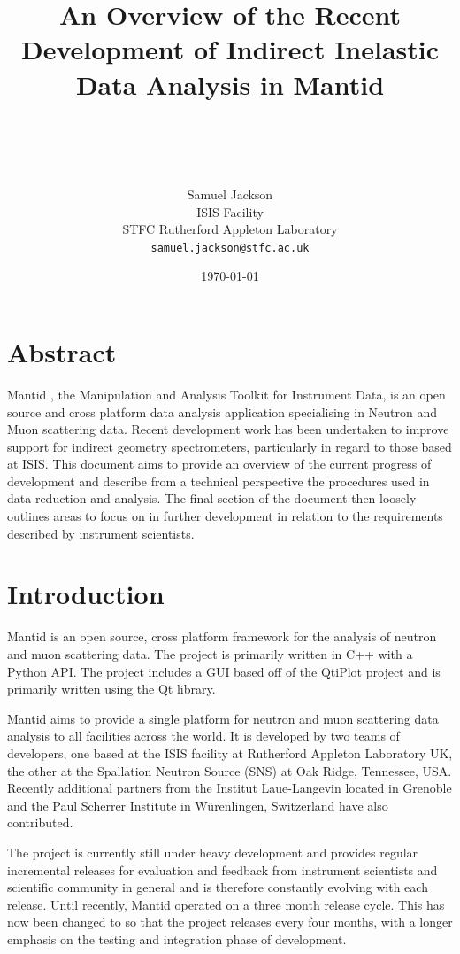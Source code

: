 \documentclass[paper=a4, fontsize=11pt]{scrartcl}	%
\title{ \vspace{-1in} 	\usefont{OT1}{bch}{b}{n}
		\huge \strut An Overview of the Recent Development of Indirect Inelastic Data Analysis in Mantid\strut \\
}
\author{ 									\usefont{OT1}{bch}{m}{n}
        Samuel Jackson\\		\usefont{OT1}{bch}{m}{n}
		ISIS Facility\\	\usefont{OT1}{bch}{m}{n}
        STFC Rutherford Appleton Laboratory\\
        \texttt{samuel.jackson@stfc.ac.uk}
}
\date{\today}
\numberwithin{equation}{section}															%
\numberwithin{figure}{section}																%
\numberwithin{table}{section}																%
\begin{document}
\maketitle
\clearpage
\tableofcontents

\clearpage
\section{Abstract}
Mantid \cite{mantid}, the Manipulation and Analysis Toolkit for Instrument Data, is an open source and cross platform data analysis application specialising in Neutron and Muon scattering data. Recent development work has been undertaken to improve support for indirect geometry spectrometers, particularly in regard to those based at ISIS. This document aims to provide an overview of the current progress of development and describe from a technical perspective the procedures used in data reduction and analysis. The final section of the document then loosely outlines areas to focus on in further development in relation to the requirements described by instrument scientists.

\clearpage
\section{Introduction}
Mantid \cite{mantid} is an open source, cross platform framework for the analysis of neutron and muon scattering data. The project is primarily written in C++ with a Python API. The project includes a GUI based off of the QtiPlot project and is primarily written using the Qt library.

Mantid aims to provide a single platform for neutron and muon scattering data analysis to all facilities across the world. It is developed by two teams of developers, one based at the ISIS facility at Rutherford Appleton Laboratory UK, the other at the Spallation Neutron Source (SNS) at Oak Ridge, Tennessee, USA. Recently additional partners from the Institut Laue-Langevin located in Grenoble and the Paul Scherrer Institute in Würenlingen, Switzerland have also contributed.

The project is currently still under heavy development and provides regular incremental releases for evaluation and feedback from instrument scientists and scientific community in general and is therefore constantly evolving with each release. Until recently, Mantid operated on a three month release cycle. This has now been changed to so that the project releases every four months, with a longer emphasis on the testing and integration phase of development.
\end{document}
